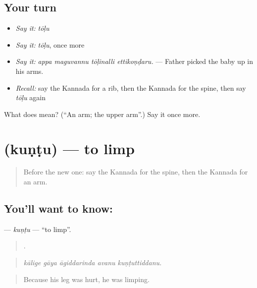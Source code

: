 \subsection*{Your turn}
\begin{itemize}
\raggedright
  \item \emph{Say it:} \emph{tōḷu}
  \item \emph{Say it:} \emph{tōḷu}, once more
  \item \emph{Say it:} \emph{appa maguvannu tōḷinalli ettikoṇḍaru.} — Father picked the baby up in his arms.
  \item \emph{Recall:} say the Kannada for a rib, then the Kannada for the spine, then say \emph{tōḷu} again
\end{itemize}

\begin{tcolorbox}[breakable,colback=teal!4,colframe=teal!35!black,title={Before you move on}]
What does  mean? (\textquotedblleft{}An arm; the upper arm\textquotedblright{}.) Say it once more.
\end{tcolorbox}
\section[\texorpdfstring{\kn{ಕುಂಟು} (kuṇṭu)}{ಕುಂಟು (kuṇṭu)}]{ (kuṇṭu) — to limp}

\label{lesson:KA-C509-kuntu}



\begin{quote}
Before the new one: say the Kannada for the spine, then the Kannada for an arm.
\end{quote}

\subsection*{You'll want to know: }
\textbf{} — \emph{kuṇṭu} — \textquotedblleft{}to limp\textquotedblright{}.

\begin{quote}
    .
\end{quote}

\begin{quote}
\emph{kālige gāya āgiddarinda avanu kuṇṭuttiddanu.}
\end{quote}

\begin{quote}
Because his leg was hurt, he was limping.
\end{quote}

